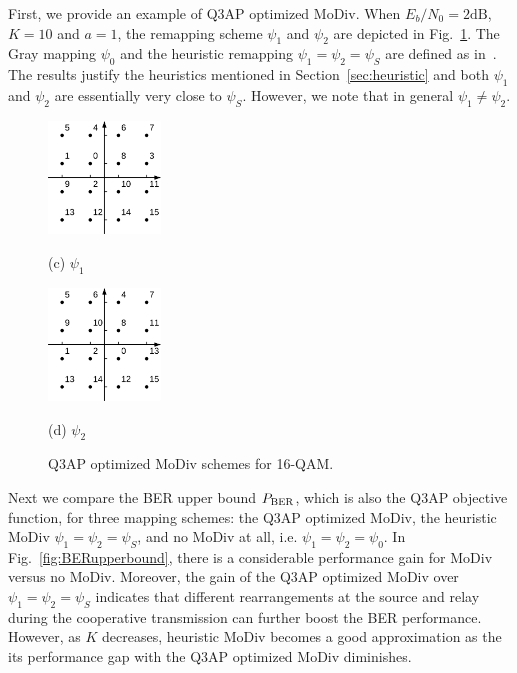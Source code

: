 \documentclass[journal]{IEEEtran}
\newcommand{\BER}{\rm{BER}}
\begin{document}
First, we provide an example of Q3AP optimized MoDiv. When $E_b/N_0 =
2\mbox{dB}$, $K = 10$ and $a = 1$, the remapping scheme $\psi_1$ and $\psi_2$
are depicted in Fig.~\ref{fig:example}. The Gray mapping $\psi_0$ and the
heuristic remapping $\psi_1=\psi_2=\psi_S$ are defined as
in~\cite{seddik2008trans}. The results justify the heuristics mentioned in
Section~\ref{sec:heuristic} and both $\psi_1$ and $\psi_2$ are essentially very
close to $\psi_S$. However, we note that in general $\psi_1\not=\psi_2$.

\begin{figure}[!t]
    \begin{minipage}[b]{0.48\linewidth}
      \centering
      \centerline{\includegraphics[width=3.0cm]{./figs/psi1.eps}}
      \centerline{(c) $\psi_1$}\medskip
    \end{minipage}
    \hfill
    \begin{minipage}[b]{.48\linewidth}
      \centering
      \centerline{\includegraphics[width=3.0cm]{./figs/psi2.eps}}
      \centerline{(d) $\psi_2$}\medskip
    \end{minipage}
    \caption{Q3AP optimized MoDiv schemes for 16-QAM.}
    \label{fig:example}
\end{figure}

Next we compare the BER upper bound $P_{\BER}$, which is also the Q3AP objective
function, for three mapping schemes: the Q3AP optimized MoDiv, the heuristic
MoDiv $\psi_1 = \psi_2 = \psi_S$, and no MoDiv at all, i.e. $\psi_1 = \psi_2 =
\psi_0$. In Fig.~\ref{fig:BERupperbound}, there is a considerable performance
gain for MoDiv versus no MoDiv. Moreover, the gain of the Q3AP optimized MoDiv
over $\psi_1 = \psi_2 = \psi_S$ indicates that different rearrangements at the
source and relay during the cooperative transmission can further boost the BER
performance. However, as $K$ decreases, heuristic MoDiv becomes a good
approximation as the its performance gap with the Q3AP optimized MoDiv
diminishes.
\end{document}
